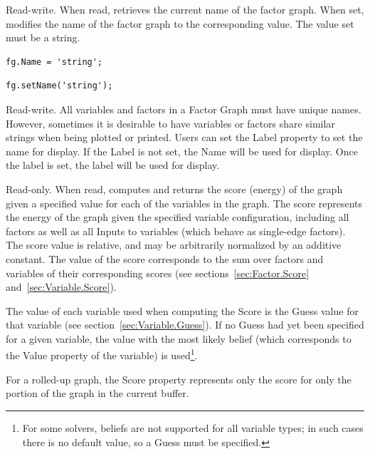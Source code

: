 
Read-write.  When read, retrieves the current name of the factor graph.  When set, modifies the name of the factor graph to the corresponding value.  The value set must be a string.

\ifmatlab
\begin{lstlisting}
fg.Name = 'string';
\end{lstlisting}
\fi

\ifjava
\begin{lstlisting}
fg.setName('string');
\end{lstlisting}
\fi


Read-write.  All variables and factors in a Factor Graph must have unique names.  However, sometimes it is desirable to have variables or factors share similar strings when being plotted or printed.  Users can set the Label property to set the name for display.  If the Label is not set, the Name will be used for display.  Once the label is set, the label will be used for display.


\label{sec:FactorGraph.Score}

Read-only.  When read, computes and returns the score (energy) of the graph given a specified value for each of the variables in the graph.  The score represents the energy of the graph given the specified variable configuration, including all factors as well as all Inputs to variables (which behave as single-edge factors).  The score value is relative, and may be arbitrarily normalized by an additive constant.  The value of the score corresponds to the sum over factors and variables of their corresponding scores (see sections~\ref{sec:Factor.Score} and~\ref{sec:Variable.Score}).

The value of each variable used when computing the Score is the Guess value for that variable (see section~\ref{sec:Variable.Guess}).  If no Guess had yet been specified for a given variable, the value with the most likely belief (which corresponds to the Value property of the variable) is used\footnote{For some solvers, beliefs are not supported for all variable types; in such cases there is no default value, so a Guess must be specified.}.

For a rolled-up graph, the Score property represents only the score for only the portion of the graph in the current buffer.


\label{sec:FactorGraph.BetheFreeEnergy}

